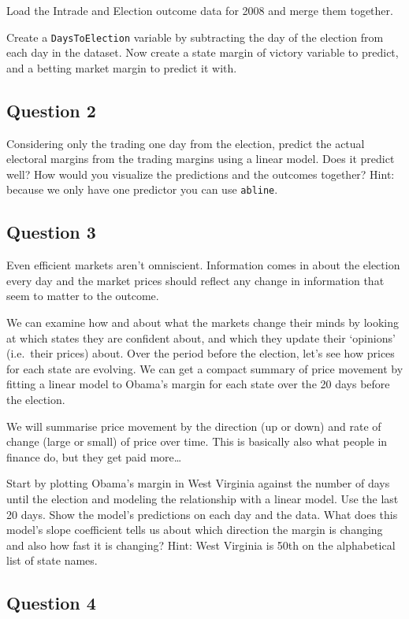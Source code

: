 \documentclass[]{article}
\begin{document}
Load the Intrade and Election outcome data for 2008 and merge them
together.

Create a \texttt{DaysToElection} variable by subtracting the day of the
election from each day in the dataset. Now create a state margin of
victory variable to predict, and a betting market margin to predict it
with.

\subsection{Question 2}\label{question-2}

Considering only the trading one day from the election, predict the
actual electoral margins from the trading margins using a linear model.
Does it predict well? How would you visualize the predictions and the
outcomes together? Hint: because we only have one predictor you can use
\texttt{abline}.

\subsection{Question 3}\label{question-3}

Even efficient markets aren't omniscient. Information comes in about the
election every day and the market prices should reflect any change in
information that seem to matter to the outcome.

We can examine how and about what the markets change their minds by
looking at which states they are confident about, and which they update
their `opinions' (i.e.~their prices) about. Over the period before the
election, let's see how prices for each state are evolving. We can get a
compact summary of price movement by fitting a linear model to Obama's
margin for each state over the 20 days before the election.

We will summarise price movement by the direction (up or down) and rate
of change (large or small) of price over time. This is basically also
what people in finance do, but they get paid more\ldots{}

Start by plotting Obama's margin in West Virginia against the number of
days until the election and modeling the relationship with a linear
model. Use the last 20 days. Show the model's predictions on each day
and the data. What does this model's slope coefficient tells us about
which direction the margin is changing and also how fast it is changing?
Hint: West Virginia is 50th on the alphabetical list of state names.

\subsection{Question 4}\label{question-4}
\end{document}

